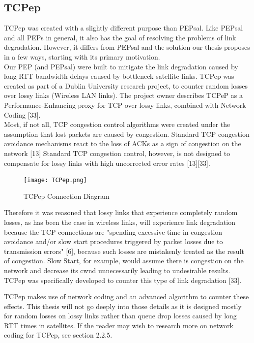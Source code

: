 \documentclass{uathesis}
\begin{document}
\subsection{TCPep}
TCPep was created with a slightly different purpose than PEPsal. Like PEPsal and all PEPs in general, it also has the goal of resolving the problems of link degradation. However, it differs from PEPsal and the solution our thesis proposes in a few ways, starting with its primary motivation. \\

Our PEP (and PEPsal) were built to mitigate the link degradation caused by long RTT bandwidth delays caused by bottleneck satellite links. TCPep was created as part of a Dublin University research project, to counter random losses over lossy links (Wireless LAN links). The project owner describes TCPeP as a Performance-Enhancing proxy for TCP over lossy links, combined with Network Coding [33].\\

Most, if not all, TCP congestion control algorithms were created under the assumption that lost packets are caused by congestion. Standard TCP congestion avoidance mechanisms react to the loss of ACKs as a sign of congestion on the network [13] Standard TCP congestion control, however, is not designed to compensate for lossy links with high uncorrected error rates [13][33].

\begin{figure}[h!]
    \centering
    \texttt{[image: TCPep.png]}
    \caption{TCPep Connection Diagram}
    \label{fig:TCPep}
\end{figure}

Therefore it was reasoned that lossy links that experience completely random losses, as has been the case in wireless links, will experience link degradation because the TCP connections are "spending excessive time in congestion avoidance and/or slow start procedures triggered by packet losses due to transmission errors" [6], because such losses are mistakenly treated as the result of congestion. Slow Start, for example, would assume there is congestion on the network and decrease its cwnd unnecessarily leading to undesirable results. TCPep was specifically developed to counter this type of link degradation [33].

TCPep makes use of network coding and an advanced algorithm to counter these effects. This thesis will not go deeply into those details as it is designed mostly for random losses on lossy links rather than queue drop losses caused by long RTT times in satellites. If the reader may wish to research more on network coding for TCPep, see section 2.2.5. 
\end{document}
